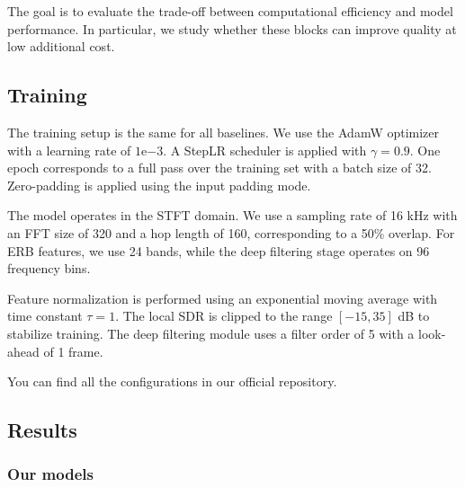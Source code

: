 \documentclass[a4paper,12pt]{extarticle}
\begin{document}
The goal is to evaluate the trade-off between computational efficiency and model performance. In particular, we study
whether these blocks can improve quality at low additional cost.


\subsection{Training}


The training setup is the same for all baselines. We use the AdamW optimizer with a learning rate of $1\mathrm{e}{-3}$.
A StepLR scheduler is applied with $\gamma = 0.9$. One epoch corresponds to a full pass over the training set with a
batch size of 32. Zero-padding is applied using the input padding mode.

The model operates in the STFT domain. We use a sampling rate of 16 kHz with an FFT size of 320 and a hop length of
160, corresponding to a 50\% overlap. For ERB features, we use 24 bands, while the deep filtering stage operates on
96 frequency bins.

Feature normalization is performed using an exponential moving average with time constant $\tau = 1$. The local SDR
is clipped to the range $[-15, 35]$ dB to stabilize training. The deep filtering module uses a filter order of 5
with a look-ahead of 1 frame.


You can find all the configurations in our official repository.



\subsection{Results}


\subsubsection{Our models}
\end{document}
